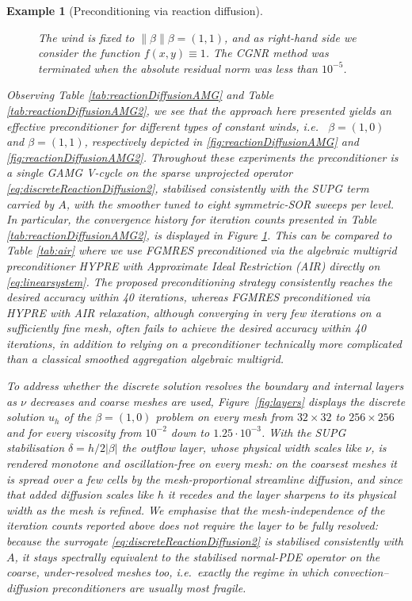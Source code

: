 \documentclass[hidelinks,onefignum,onetabnum]{siamart220329}
\newcommand{\bb}[1]{#1}
\newtheorem{example}{Example}
\newcommand{\norm}[1]{\left\lVert#1\right\rVert}
\begin{document}
\begin{example}[Preconditioning via reaction diffusion]
\begin{figure}[h]
{            The wind is fixed to $\norm{\beta}\beta = (1,1)$, and as right-hand side we consider the function $f(x,y) \equiv 1$.
            The CGNR method was terminated when the absolute residual  \bb{norm} was less than $10^{-5}$.}
        \label{fig:convergenceHistory}
    \end{figure}
    Observing Table \ref{tab:reactionDiffusionAMG} and Table \ref{tab:reactionDiffusionAMG2}, we see that the approach here presented yields an effective preconditioner for different types of constant winds, i.e.~ $\beta=(1,0)$ and $\beta=(1,1)$, respectively depicted in \cref{fig:reactionDiffusionAMG} and \cref{fig:reactionDiffusionAMG2}.
    {Throughout these experiments the preconditioner is a single GAMG V-cycle on the sparse unprojected operator \eqref{eq:discreteReactionDiffusion2}, stabilised consistently with the SUPG term carried by $A$, with the smoother tuned to eight symmetric-SOR sweeps per level.}
    In particular, the convergence history for iteration counts presented in Table \ref{tab:reactionDiffusionAMG2}, is displayed in Figure \ref{fig:convergenceHistory}.
    This can be compared to Table \ref{tab:air} where we use FGMRES preconditioned via the algebraic multigrid preconditioner HYPRE with Approximate Ideal Restriction (AIR) \cite{air,air2,air3} directly on \eqref{eq:linearsystem}. The proposed preconditioning strategy consistently reaches the desired accuracy within 40 iterations, whereas FGMRES preconditioned via HYPRE with AIR relaxation, although converging in very few iterations on a sufficiently fine mesh, often fails to achieve the desired accuracy within 40 iterations, in addition to relying on a preconditioner technically more complicated than a classical smoothed aggregation algebraic multigrid.

\bb{To address whether the discrete solution resolves the boundary and internal layers as $\nu$ decreases and coarse meshes are used, Figure~\ref{fig:layers} displays the discrete solution $u_h$ of the $\beta=(1,0)$ problem on every mesh from $32\times 32$ to $256\times 256$ and for every viscosity from $10^{-2}$ down to $1.25\cdot 10^{-3}$. With the SUPG stabilisation $\delta = h/2|\beta|$ the outflow layer, whose physical width scales like $\nu$, is rendered \emph{monotone and oscillation-free} on every mesh: on the coarsest meshes it is spread over a few cells by the mesh-proportional streamline diffusion, and since that added diffusion scales like $h$ it recedes and the layer sharpens to its physical width as the mesh is refined. We emphasise that the mesh-independence of the iteration counts reported above does \emph{not} require the layer to be fully resolved: because the surrogate \eqref{eq:discreteReactionDiffusion2} is stabilised consistently with $A$, it stays spectrally equivalent to the stabilised normal-PDE operator on the coarse, under-resolved meshes too, i.e.~exactly the regime in which convection--diffusion preconditioners are usually most fragile.}


\end{example}
\end{document}
